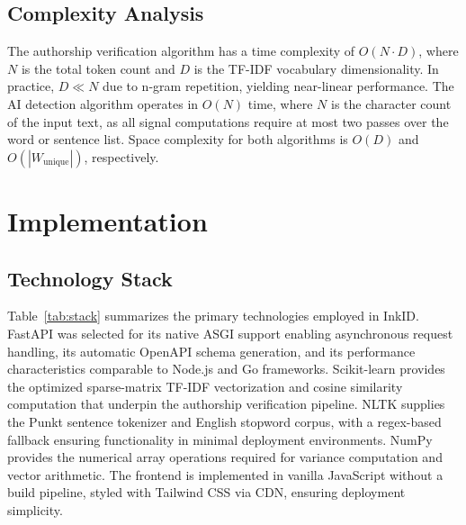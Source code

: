 \documentclass[conference]{IEEEtran}
\begin{document}
\subsection{Complexity Analysis}

The authorship verification algorithm has a time complexity of $O(N \cdot D)$,
where $N$ is the total token count and $D$ is the TF-IDF vocabulary
dimensionality. In practice, $D \ll N$ due to n-gram repetition, yielding
near-linear performance. The AI detection algorithm operates in $O(N)$ time,
where $N$ is the character count of the input text, as all signal computations
require at most two passes over the word or sentence list. Space complexity for
both algorithms is $O(D)$ and $O(|W_{\text{unique}}|)$, respectively.

\section{Implementation}
\label{sec:implementation}

\subsection{Technology Stack}

Table~\ref{tab:stack} summarizes the primary technologies employed in InkID.
FastAPI \cite{fastapi} was selected for its native ASGI support enabling
asynchronous request handling, its automatic OpenAPI schema generation, and its
performance characteristics comparable to Node.js and Go frameworks.
Scikit-learn \cite{pedregosa2011scikit} provides the optimized sparse-matrix
TF-IDF vectorization and cosine similarity computation that underpin the
authorship verification pipeline. NLTK \cite{bird2009nltk} supplies the Punkt
sentence tokenizer and English stopword corpus, with a regex-based fallback
ensuring functionality in minimal deployment environments. NumPy
\cite{harris2020numpy} provides the numerical array operations required for
variance computation and vector arithmetic. The frontend is implemented in
vanilla JavaScript without a build pipeline, styled with Tailwind CSS via CDN,
ensuring deployment simplicity.
\end{document}
